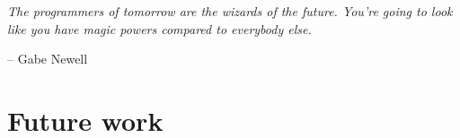 \epigraph{\textit{The programmers of tomorrow are the wizards of the future. You're going to look like you have magic powers compared to everybody else.}}{-- \textup{Gabe Newell}}

\section{Future work}